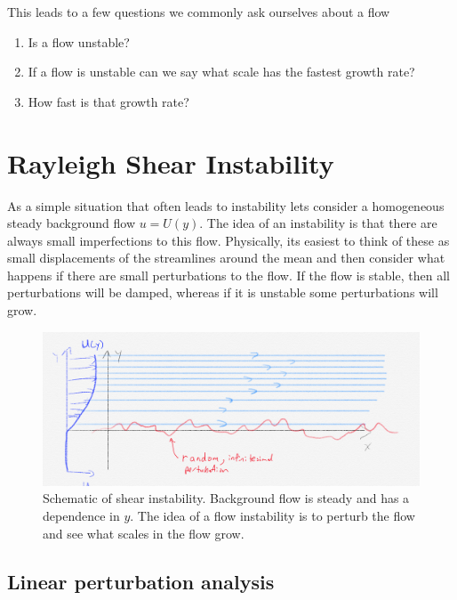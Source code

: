\documentclass[11pt]{article}
\begin{document}
This leads to a few questions we commonly ask ourselves about a flow
\begin{enumerate}
  \item Is a flow unstable? 
  \item If a flow is unstable can we say what scale has the fastest growth rate?
  \item How fast is that growth rate?   
\end{enumerate}

\section{Rayleigh Shear Instability}

As a simple situation that often leads to instability lets consider a homogeneous steady background flow $u = U(y)$.  The idea of an instability is that there are always small imperfections to this flow.  Physically, its easiest to think of these as small displacements of the streamlines around the mean and then consider what happens if there are small perturbations to the flow.  If the flow is stable, then all perturbations will be damped, whereas if it is unstable some perturbations will grow. 


\begin{figure}[hbtp]
  \begin{center}
    \includegraphics[width=5in]{images/ShearInstabilitySketch.png} 
    \caption{Schematic of shear instability.  Background flow is steady and has a dependence in $y$. The idea of a flow instability is to perturb the flow and see what scales in the flow grow.   }
    \label{fig:Instability}
  \end{center}
\end{figure}

\subsection{Linear perturbation analysis}
\end{document}
